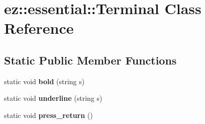 \hypertarget{classez_1_1essential_1_1Terminal}{}\section{ez\+:\+:essential\+:\+:Terminal Class Reference}
\label{classez_1_1essential_1_1Terminal}
\subsection*{Static Public Member Functions}
\begin{DoxyCompactItemize}
\item 
\mbox{\label{classez_1_1essential_1_1Terminal_a912fcf69741942c84e06640ca8dcb2b0}} 
static void {\bfseries bold} (string s)
\item 
\mbox{\label{classez_1_1essential_1_1Terminal_a3ecbe3dec95ad94fe3f03da5802c6034}} 
static void {\bfseries underline} (string s)
\item 
\mbox{\label{classez_1_1essential_1_1Terminal_ae4878715b58cadf3bf69c7207513bb5e}} 
static void {\bfseries press\+\_\+return} ()
\end{DoxyCompactItemize}
